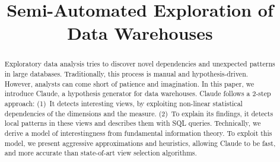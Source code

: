 \documentclass{sig-alternate}
\begin{document}
\title{Semi-Automated Exploration of Data Warehouses}



\maketitle

\begin{abstract}
Exploratory data analysis tries to discover novel dependencies and unexpected
patterns in large databases. Traditional\-ly, this process is manual and
hypothesis-driven. However, analysts can come short of patience and
imagination. In this paper, we introduce Claude, a hypothesis generator for
data warehouses. Claude follows a 2-step approach: (1)~It detects interesting
views, by exploiting non-linear statistical dependencies of the dimensions
and the measure. (2)~To explain its findings, it detects local patterns in
these views and describes them with SQL queries.  Technically, we derive a
model of interestingness from fundamental information theory. To exploit this
model, we present aggressive approximations and heuristics, allowing Claude to
be fast, and more accurate than state-of-art view selection algorithms. 
\end{abstract}




\balancecolumns
\end{document}
